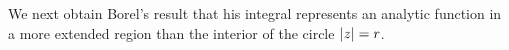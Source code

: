We next obtain Borel's result that his integral represents an analytic
function in a more extended region than the interior of the circle
$\left| z \right| = r$.
%
%
%
%
%
